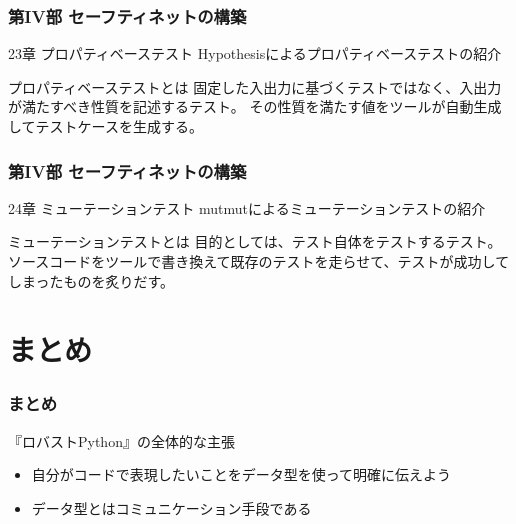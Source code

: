 \documentclass[aspectratio=169,dvipdfmx,14pt,notheorems]{beamer}
\theoremstyle{definition}
\begin{document}
\begin{frame}\frametitle{第IV部 セーフティネットの構築}

\begin{block}{23章 プロパティベーステスト}
Hypothesisによるプロパティベーステストの紹介
\end{block}

\begin{exampleblock}{プロパティベーステストとは}
固定した入出力に基づくテストではなく、入出力が満たすべき性質を記述するテスト。
その性質を満たす値をツールが自動生成してテストケースを生成する。
\end{exampleblock}

\end{frame}

\begin{frame}\frametitle{第IV部 セーフティネットの構築}

\begin{block}{24章 ミューテーションテスト}
mutmutによるミューテーションテストの紹介
\end{block}

\begin{exampleblock}{ミューテーションテストとは}
目的としては、テスト自体をテストするテスト。
ソースコードをツールで書き換えて既存のテストを走らせて、テストが成功してしまったものを炙りだす。
\end{exampleblock}

\end{frame}

\section{まとめ}

\begin{frame}\frametitle{まとめ}

\begin{block}{『ロバストPython』の全体的な主張}
\begin{itemize}
\item 自分がコードで表現したいことをデータ型を使って明確に伝えよう
\item データ型とはコミュニケーション手段である
\end{itemize}
\end{block}

\end{frame}
\end{document}
